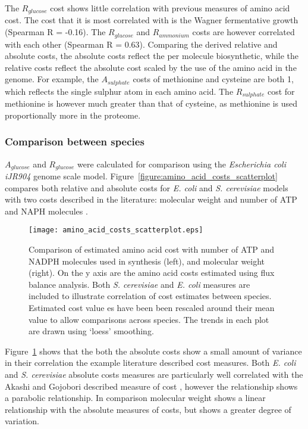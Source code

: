 The $R_{glucose}$ cost shows little correlation with previous measures of amino acid cost. The cost that it is most correlated with is the Wagner fermentative growth (Spearman R = -0.16). The $R_{glucose}$ and $R_{ammonium}$ costs are however correlated with each other (Spearman R = 0.63). Comparing the derived relative and absolute costs, the absolute costs reflect the per molecule biosynthetic, while the relative costs reflect the absolute cost scaled by the use of the amino acid in the genome. For example, the $A_{sulphate}$ costs of methionine and cysteine are both 1, which reflects the single sulphur atom in each amino acid. The $R_{sulphate}$ cost for methionine is however much greater than that of cysteine, as methionine is used proportionally more in the proteome.

\subsubsection{Comparison between species}

$A_{glucose}$ and $R_{glucose}$ were calculated for comparison using the \emph{Escherichia coli iJR904} genome scale model. Figure~\vref{figure:amino_acid_costs_scatterplot} compares both relative and absolute costs for \emph{E. coli} and \emph{S. cerevisiae} models with two costs described in the literature: molecular weight \cite{seligmann2004} and number of ATP and NAPH molecules \cite{akashi2002}.

\begin{figure}
\centering
\texttt{[image: amino\_acid\_costs\_scatterplot.eps]}
\caption[Comparison of the genome scale model derived cost data sets.]{Comparison of estimated amino acid cost with number of ATP and NADPH molecules used in synthesis (left), and molecular weight (right). On the y axis are the amino acid costs estimated using flux balance analysis. Both \emph{S. cerevisiae} and \emph{E. coli} measures are included to illustrate correlation of cost estimates between species. Estimated cost value
es have been been rescaled around their mean value to allow comparisons across species. The trends in each plot are drawn using `loess' smoothing.}
\label{figure:amino_acid_costs_scatterplot}
\end{figure}

Figure~\ref{figure:amino_acid_costs_scatterplot} shows that the both the absolute costs show a small amount of variance in their correlation the example literature described cost measures. Both \emph{E. coli} and \emph{S. cerevisiae} absolute costs measures are particularly well correlated with the Akashi and Gojobori described measure of cost \cite{akashi2002}, however the relationship shows a parabolic relationship. In comparison molecular weight shows a linear relationship with the absolute measures of costs, but shows a greater degree of variation.

